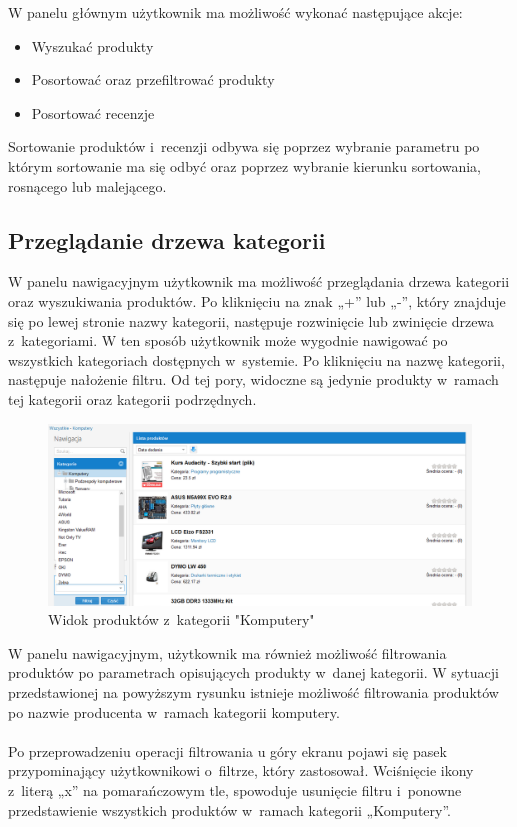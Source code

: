 W panelu głównym użytkownik ma możliwość wykonać następujące akcje:

\begin{itemize}
\item Wyszukać produkty
\item Posortować oraz przefiltrować produkty
\item Posortować recenzje
\end{itemize}

Sortowanie produktów i~recenzji odbywa się poprzez wybranie parametru po którym sortowanie ma się odbyć oraz poprzez wybranie kierunku sortowania, rosnącego lub malejącego.

\subsection{Przeglądanie drzewa kategorii}

W panelu nawigacyjnym użytkownik ma możliwość przeglądania drzewa kategorii oraz wyszukiwania produktów. Po kliknięciu na znak „+” lub „-”, który znajduje się po lewej stronie nazwy kategorii, następuje rozwinięcie lub zwinięcie drzewa z~kategoriami. W ten sposób użytkownik może wygodnie nawigować po wszystkich kategoriach dostępnych w~systemie. Po kliknięciu na nazwę kategorii, następuje nałożenie filtru. Od tej pory, widoczne są jedynie produkty w~ramach tej kategorii oraz kategorii podrzędnych.

\begin{figure}[h]
	\centering
	\includegraphics[width=1.00\textwidth]{images/filtr_kategorii.png}
	\caption{Widok produktów z~kategorii "Komputery"}
\end{figure}

W panelu nawigacyjnym, użytkownik ma również możliwość filtrowania produktów po parametrach opisujących produkty w~danej kategorii. W sytuacji przedstawionej na powyższym rysunku istnieje możliwość filtrowania produktów po nazwie producenta w~ramach kategorii komputery.
\paragraph{}
Po przeprowadzeniu operacji filtrowania u góry ekranu pojawi się pasek przypominający użytkownikowi o~filtrze, który zastosował. Wciśnięcie ikony z~literą „x” na pomarańczowym tle, spowoduje usunięcie filtru i~ponowne przedstawienie wszystkich produktów w~ramach kategorii „Komputery”.

